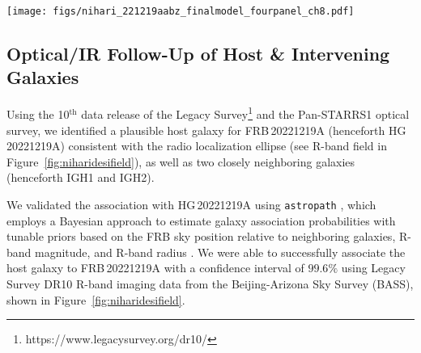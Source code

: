 \documentclass[twocolumn, linenumbers, tra]{aastex631}
\newcommand{\rev}[1]{{\color{purple}#1}}
\newcommand{\nihari}{FRB\,20221219A } %
\begin{document}
\begin{figure*}
  \centering
  \hspace{-0cm}
  \texttt{[image: figs/nihari\_221219aabz\_finalmodel\_fourpanel\_ch8.pdf]}
  \caption{\rev{A 2D fit of the pulse model defined in Eq.~\ref{eq:expgauss} to \nihari. \textit{Panel A:} The dynamic (time-frequency) spectrum downsampled in time by a factor of 8 ($\Delta t = 0.262\ \mathrm{ms}$) and in frequency by a factor of 768 to form 8 channels across the band ($\Delta \nu = 23.438\ \mathrm{MHz}$). To better visualize the burst in the dynamic spectrum, we smoothed the data in time using a 1D Savitzky--Golay filter with a 31 bin ($8.13\ \mathrm{ms}$) smoothing kernel of polynomial order $k=3$, indicated by the hatched rectangle. The timeseries in the upper sub-panel is downsampled but not smoothed, showing both the total intensity ($\mathrm{I_{data}}$, black) and linearly polarized signal ($\mathrm{L_{data}}$, magenta). \textit{Panel B: } The best-fit model dynamic spectrum, for which the best-fit parameters can be found in Table~\ref{tab:nihariprops} and full posteriors are shown in Figure\ \ref{fig:corner}. \textit{Panel C: } The sum of the model dynamic spectrum with randomly sampled noise obeying a log-normal distribution, as characterized for each channel in the off-pulse data. \textit{Panel D: } The residual dynamic spectrum, here obtained by subtracting the model spectrum with added noise from the data.}}
  \label{fig:nihariwfall}
\end{figure*}

\subsection{Optical/IR Follow-Up of Host \& Intervening Galaxies}\label{sec:hostID}

Using the 10$^{\mathrm{th}}$ data release of the Legacy Survey\footnote{https://www.legacysurvey.org/dr10/} \citep[DR10 R-band image;][]{Dey2019} and the Pan-STARRS1 \citep[PS1;][]{Chambers2016} optical survey, we identified a plausible host galaxy for \nihari (henceforth HG\,20221219A) consistent with the radio localization ellipse (see R-band field in Figure\ \ref{fig:niharidesifield}), as well as two closely neighboring galaxies (henceforth IGH1 and IGH2).

We validated the association with HG\,20221219A using \texttt{astropath} \citep{Aggarwal2021}, which employs a Bayesian approach to estimate galaxy association probabilities with tunable priors based on the FRB sky position relative to neighboring galaxies, R-band magnitude, and R-band radius \citep[see the SED fit in Figure\ \ref{fig:niharised} and][for details regarding host galaxy association methods]{Sharma2023, Law2023}. We were able to successfully associate the host galaxy to \nihari with a confidence interval of $99.6\%$ using Legacy Survey DR10 R-band imaging data from the Beijing-Arizona Sky Survey (BASS), shown in Figure\ \ref{fig:niharidesifield}. 
\end{document}
